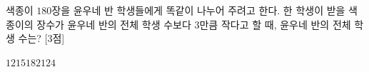 색종이 $180$장을 윤우네 반 학생들에게 똑같이 나누어 주려고 한다. 한 학생이 받을 색종이의 장수가 윤우네 반의 전체 학생 수보다 $3$만큼 작다고 할 때, 윤우네 반의 전체 학생 수는? \mbox{[3점]}
\begin{choices32}{$12$}{$15$}{$18$}{$21$}{$24$}\end{choices32}

